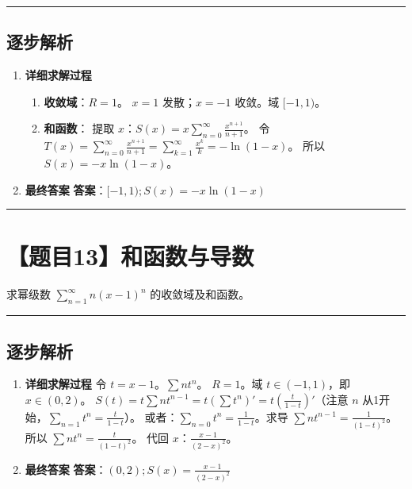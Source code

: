 \documentclass[UTF8]{ctexart}
\newenvironment{redenv}{\color{red}}{}
\newenvironment{detailedanalysis}{%
    \color{red}
    \begin{enumerate}[label=\textbf{第\arabic*步：}, leftmargin=*, align=left, itemsep=1.5ex]
}{%
    \end{enumerate}
}
\newcommand{\problemrule}{\noindent\rule{\textwidth}{1.5pt}\vspace{-0.8em}}
\newcommand{\analysisrule}{\noindent\rule{\textwidth}{0.8pt}\vspace{-0.8em}}
\begin{document}
\begin{redenv}
\analysisrule
\subsection*{逐步解析}

\begin{detailedanalysis}
\item \textbf{详细求解过程}
\begin{enumerate}[label=(\arabic*)]
\item \textbf{收敛域}：$R=1$。
$x=1$ 发散；$x=-1$ 收敛。域 $[-1, 1)$。
\item \textbf{和函数}：
提取 $x$：$S(x) = x \sum_{n=0}^{\infty} \frac{x^{n+1}}{n+1}$。
令 $T(x) = \sum_{n=0}^{\infty} \frac{x^{n+1}}{n+1} = \sum_{k=1}^{\infty} \frac{x^k}{k} = -\ln(1-x)$。
所以 $S(x) = -x\ln(1-x)$。
\end{enumerate}

\item \textbf{最终答案}
\textbf{答案}：$ [-1, 1); S(x)=-x\ln(1-x) $
\end{detailedanalysis}
\end{redenv}

\problemrule
\section*{【题目13】和函数与导数}
求幂级数 $ \sum_{n=1}^{\infty} n(x-1)^{n} $ 的收敛域及和函数。

\begin{redenv}
\analysisrule
\subsection*{逐步解析}

\begin{detailedanalysis}
\item \textbf{详细求解过程}
令 $t = x-1$。$\sum n t^n$。
$R=1$。域 $t \in (-1, 1)$，即 $x \in (0, 2)$。
$S(t) = t \sum n t^{n-1} = t (\sum t^n)' = t (\frac{t}{1-t})'$（注意 $n$ 从1开始，$\sum_{n=1} t^n = \frac{t}{1-t}$）。
或者：$\sum_{n=0} t^n = \frac{1}{1-t}$。求导 $\sum n t^{n-1} = \frac{1}{(1-t)^2}$。
所以 $\sum n t^n = \frac{t}{(1-t)^2}$。
代回 $x$：$\frac{x-1}{(2-x)^2}$。

\item \textbf{最终答案}
\textbf{答案}：$ (0, 2); S(x)=\frac{x-1}{(2-x)^2} $
\end{detailedanalysis}
\end{redenv}
\end{document}
